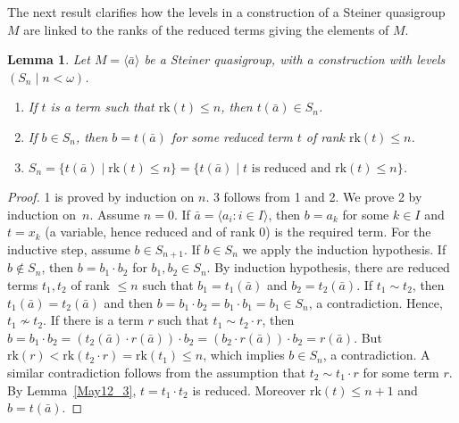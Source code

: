 \documentclass[10pt,a4paper]{article}
\newcommand{\rk}{\mathrm{rk}}
\theoremstyle{note}
\newtheorem{lemma}[thm]{Lemma}
\begin{document}
The next result clarifies how the levels in a construction of a Steiner quasigroup $M$ are linked to the ranks of the reduced terms giving the elements of $M$.
	\begin{lemma}\label{May12_4} Let $M=\langle \bar{a}\rangle$ be a  Steiner quasigroup, with a construction  with levels $(S_n\mid n<\omega)$.
		\begin{enumerate}
			\item If $t$ is a term such that $\rk(t)\leq n$, then $t(\bar{a})\in S_n$.
			\item If $b\in S_n$, then  $b= t(\bar{a})$  for some reduced term $t$ of rank $\rk(t)\leq n$.
			\item  $S_n= \{t(\bar{a})\mid \rk(t)\leq n\} = \{t(\bar{a})\mid t \mbox{ is reduced and } \rk(t)\leq n\}$.
		\end{enumerate}
	\end{lemma}
	\begin{proof} 1 is proved by induction on $n$.  3 follows from 1 and 2. We prove 2 by induction on~$n$.  Assume $n=0$.  If $\bar{a}= \langle a_i : i \in I \rangle$, then $b =a_k$  for some $k \in I$ and $t=x_k$ (a variable, hence reduced and of rank $0$) is the required term. For the inductive step, assume $b\in S_{n+1}$.  If $b\in S_n$ we apply the induction hypothesis. If $b\not\in S_n$, then $b= b_1\cdot b_2$ for $b_1,b_2\in S_n$.  By induction hypothesis, there are reduced terms  $t_1,t_2$ of rank $\leq n$ such that $b_1= t_1(\bar{a})$ and $b_2= t_2(\bar{a})$.  If $t_1\sim t_2$, then $t_1(\bar{a})=t_2(\bar{a})$ and then $b= b_1\cdot b_2 = b_1\cdot b_1 = b_1 \in S_n$, a contradiction. Hence, $t_1\not\sim t_2$.  If there is a term $r$ such that $t_1\sim t_2\cdot r$, then  $b= b_1\cdot b_2=(t_2(\bar{a})\cdot r(\bar{a}))\cdot b_2 = (b_2\cdot r(\bar{a}))\cdot b_2 = r(\bar{a})$. But $\rk(r) <\rk(t_2\cdot r) =\rk(t_1)\leq n$, which implies $b\in S_n$, a contradiction. A similar contradiction follows from the assumption that $t_2\sim t_1\cdot r$ for some term $r$. By  Lemma~\ref{May12_3}, $t= t_1\cdot t_2$ is reduced. Moreover $\rk(t)\leq n+1$  and  $b= t(\bar{a})$.
	\end{proof}
\end{document}
